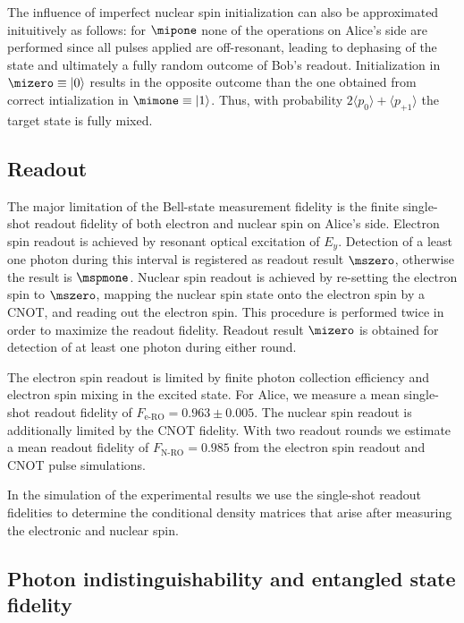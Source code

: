 The influence of imperfect nuclear spin initialization can also be approximated inituitively as follows: for $\mipone$ none of the operations on Alice's side are performed since all pulses applied are off-resonant, leading to dephasing of the state and ultimately a fully random outcome of Bob's readout. Initialization in $\mizero \equiv \ket0$ results in the opposite outcome than the one obtained from correct intialization in $\mimone \equiv \ket1$. Thus, with probability $2 \langle p_{0} \rangle + \langle p_{+1} \rangle$ the target state is fully mixed.

\subsection{Readout}
\label{sec:readout-error}

The major limitation of the Bell-state measurement fidelity is the finite single-shot readout fidelity of both electron and nuclear spin on Alice's side. Electron spin readout is achieved by resonant optical excitation of $E_y$. Detection of a least one photon during this interval is registered as readout result $\mszero$, otherwise the result is $\mspmone$. Nuclear spin readout is achieved by re-setting the electron spin to $\mszero$, mapping the nuclear spin state onto the electron spin by a CNOT, and reading out the electron spin. This procedure is performed twice in order to maximize the readout fidelity\cite{Robledo:2011fs}. 
Readout result $\mizero$ is obtained for detection of at least one photon during either round.

The electron spin readout is limited by finite photon collection efficiency and electron spin mixing in the excited state\cite{Robledo:2011fs}. 
For Alice, we measure a mean single-shot readout fidelity of $F_\text{e-RO} = 0.963 \pm 0.005$. The nuclear spin readout is additionally limited by the CNOT fidelity. With two readout rounds we estimate a mean readout fidelity of $F_\text{N-RO} = 0.985$ from the electron spin readout and CNOT pulse simulations.

In the simulation of the experimental results we use the single-shot readout fidelities to determine the conditional density matrices that arise after measuring the electronic and nuclear spin.

\subsection{Photon indistinguishability and entangled state fidelity}
\label{sec:lde-visibility}

